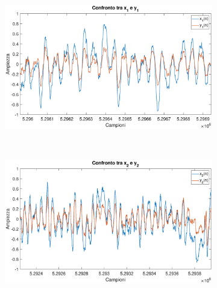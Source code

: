 \documentclass[12pt,a4paper,titlepage]{article}
\begin{document}
\begin{figure}[h]
	\centering
	\begin{subfigure}{1\textwidth}
		\includegraphics[width=1\textwidth]{Immagini/x1_y1_FD}
		\caption{}
		\label{fig:x1_y1_FD}
	\end{subfigure}\\
	\begin{subfigure}{1\textwidth}
		\includegraphics[width=1\textwidth]{Immagini/x2_y2_FD}
		\caption{}
		\label{fig:x2_y2_FD}
	\end{subfigure}
\end{figure}
\end{document}
